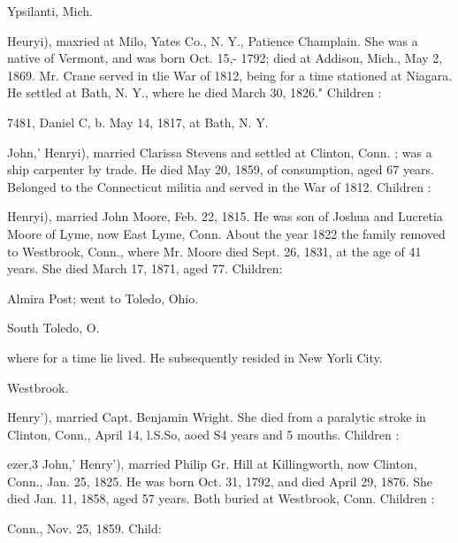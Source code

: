 \documentclass[oneside]{book}
\begin{document}
Ypsilanti, Mich. 



Heuryi), maxried at Milo, Yates Co., N. Y., Patience Champlain. 
She was a native of Vermont, and was born Oct. 15,- 1792; died 
at Addison, Mich., May 2, 1869. Mr. Crane served in tlie War 
of 1812, being for a time stationed at Niagara. He settled at 
Bath, N. Y., where he died March 30, 1826." Children : 

7481, Daniel C, b. May 14, 1817, at Bath, N. Y. 

John,' Henryi), married Clarissa Stevens and settled at Clinton, 
Conn. ; was a ship carpenter by trade. He died May 20, 1859, 
of consumption, aged 67 years. Belonged to the Connecticut 
militia and served in the War of 1812. Children : 


Henryi), married John Moore, Feb. 22, 1815. He was son of 
Joshua and Lucretia Moore of Lyme, now East Lyme, Conn. 
About the year 1822 the family removed to Westbrook, Conn., 
where Mr. Moore died Sept. 26, 1831, at the age of 41 years. 
She died March 17, 1871, aged 77. Children: 


Almira Post; went to Toledo, Ohio. 








South Toledo, O. 













where for a time lie lived. He subsequently resided in New 
Yorli City. 


Westbrook. 

Henry'), married Capt. Benjamin Wright. She died from a 
paralytic stroke in Clinton, Conn., April 14, l.S.So, aoed S4 years 
and 5 mouths. Children : 








ezer,3 John,' Henry'), married Philip Gr. Hill at Killingworth, 
now Clinton, Conn., Jan. 25, 1825. He was born Oct. 31, 1792, 
and died April 29, 1876. She died Jan. 11, 1858, aged 57 years. 
Both buried at Westbrook, Conn. Children : 








Conn., Nov. 25, 1859. Child: 
\end{document}
